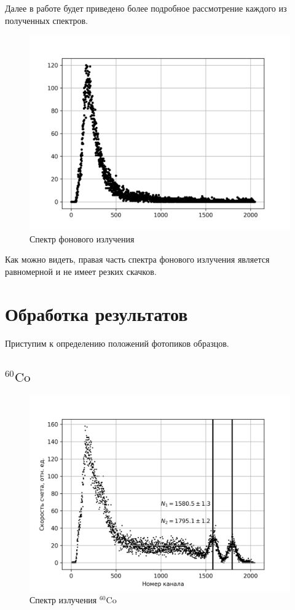 \documentclass[14pt, a4paper]{report}
\begin{document}
Далее в работе будет приведено более подробное рассмотрение каждого из полученных спектров.

\begin{figure}[H]
\centering
\includegraphics[width=.7\textwidth]{../images/555-bg}
\caption{Спектр фонового излучения}
\end{figure}

Как можно видеть, правая часть спектра фонового излучения является равномерной и не имеет резких скачков.

\section{Обработка результатов}

Приступим к определению положений фотопиков образцов.

\subsection{$^{60}\text{Co}$}

\begin{figure}[H]
\centering
\includegraphics[width=.7\textwidth]{../images/555-co60}
\caption{Спектр излучения $^{60}\text{Co}$}
\end{figure}
\end{document}
